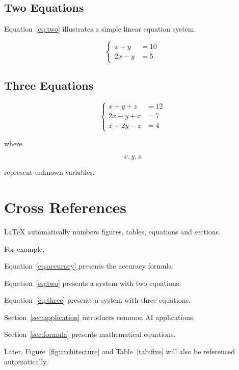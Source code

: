 \documentclass[pdflatex,sn-mathphys-num]{sn-jnl}%
\theoremstyle{thmstyleone}%
\theoremstyle{thmstyletwo}%
\theoremstyle{thmstylethree}%
\begin{document}
\subsection{Two Equations}

Equation~\ref{eq:two} illustrates a simple linear equation system.

\begin{equation}
\left\{
\begin{aligned}
x+y &=10\\
2x-y &=5
\end{aligned}
\right.
\label{eq:two}
\end{equation}


\subsection{Three Equations}

\begin{equation}
\left\{
\begin{aligned}
x+y+z &=12\\
2x-y+z &=7\\
x+2y-z &=4
\end{aligned}
\right.
\label{eq:three}
\end{equation}

where

\[
x,y,z
\]

represent unknown variables.

\section{Cross References}

LaTeX automatically numbers figures, tables, equations and sections.

For example,

Equation~\ref{eq:accuracy} presents the accuracy formula.

Equation~\ref{eq:two} presents a system with two equations.

Equation~\ref{eq:three} presents a system with three equations.

Section~\ref{sec:application} introduces common AI applications.

Section~\ref{sec:formula} presents mathematical equations.

Later, Figure~\ref{fig:architecture} and Table~\ref{tab:five} will also be referenced automatically.
\end{document}
